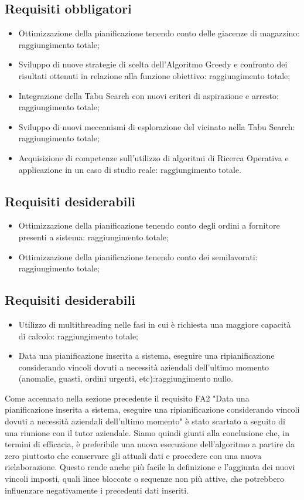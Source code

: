 \subsection{Requisiti obbligatori}
\begin{itemize}
	\item Ottimizzazione della pianificazione tenendo conto delle giacenze
	di magazzino: raggiungimento totale;
	\item Sviluppo di nuove strategie di scelta dell’Algoritmo Greedy e
	confronto dei risultati ottenuti in relazione alla funzione obiettivo: raggiungimento totale;
	\item Integrazione della Tabu Search con nuovi criteri di aspirazione e
	arresto: raggiungimento totale;
	\item Sviluppo di nuovi meccanismi di esplorazione del vicinato nella
	Tabu Search: raggiungimento totale;
	\item Acquisizione di competenze sull’utilizzo di algoritmi di Ricerca
	Operativa e applicazione in un caso di studio reale: raggiungimento totale.

	
\end{itemize}

\subsection{Requisiti desiderabili}
\begin{itemize}
	\item Ottimizzazione della pianificazione tenendo conto degli ordini a
	fornitore presenti a sistema: raggiungimento totale;
	\item Ottimizzazione della pianificazione tenendo conto dei
	semilavorati: raggiungimento totale;
\end{itemize}

\subsection{Requisiti desiderabili}
\begin{itemize}
	\item Utilizzo di multithreading nelle fasi in cui è richiesta una maggiore
	capacità di calcolo: raggiungimento totale;
	\item Data una pianificazione inserita a sistema, eseguire una
	ripianificazione considerando vincoli dovuti a necessità aziendali
	dell’ultimo momento (anomalie, guasti, ordini urgenti, etc):raggiungimento nullo.
\end{itemize}

Come accennato nella sezione precedente il requisito FA2 "Data una pianificazione inserita a sistema, eseguire una
ripianificazione considerando vincoli dovuti a necessità aziendali
dell’ultimo momento" è stato scartato a seguito di una riunione con il tutor aziendale. Siamo quindi giunti alla conclusione che, in termini di efficacia, è preferibile una nuova esecuzione dell'algoritmo a partire da zero piuttosto che conservare gli attuali dati e procedere con una nuova rielaborazione. Questo rende anche più facile la definizione e l'aggiunta dei nuovi vincoli imposti, quali linee bloccate o sequenze non più attive, che potrebbero influenzare negativamente i precedenti dati inseriti.

